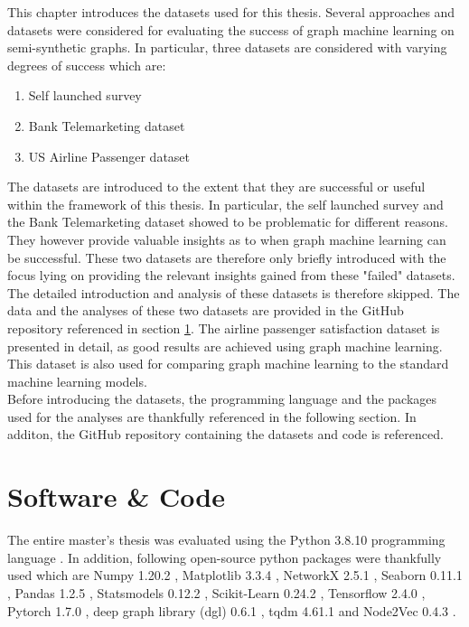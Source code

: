   
  This chapter introduces the datasets used for this thesis. Several approaches
  and datasets were considered for evaluating the success of graph machine
  learning on semi-synthetic graphs. In particular, three datasets are 
  considered with varying degrees of success which are:

  \begin{enumerate}
    \item Self launched survey
    \item Bank Telemarketing dataset
    \item US Airline Passenger dataset
  \end{enumerate}

  \noindent The datasets are introduced to the extent that they are successful 
  or useful within the framework of this thesis. In particular, the self 
  launched survey and the Bank Telemarketing dataset showed to be problematic 
  for different reasons. They however provide valuable insights as to when 
  graph machine learning can be successful. These two datasets are therefore 
  only briefly introduced with the focus lying on providing the relevant 
  insights gained from these "failed" datasets. The detailed introduction and
  analysis of these datasets is therefore skipped. The data and the analyses of
  these two datasets are provided in the GitHub repository referenced in
  section \ref{section:software}. The airline passenger satisfaction dataset 
  is presented in detail, as good results are achieved using graph machine 
  learning. This dataset is also used for comparing graph machine learning 
  to the standard machine learning models. \\

  \noindent Before introducing the datasets, the programming language and the
   packages used for the analyses are thankfully referenced in the following 
   section. In additon, the GitHub repository containing the datasets and code
   is referenced.

  \section{Software \& Code}
  \label{section:software}

  The entire master's thesis was evaluated using the Python 3.8.10 programming
  language \citep{vanRossum2009}. In addition, following open-source python
  packages were thankfully used which are Numpy 1.20.2 \citep{harris2020array},
  Matplotlib 3.3.4 \citep{Hunter2007}, NetworkX 2.5.1 \citep{hagberg2008exploring}, 
  Seaborn 0.11.1 \citep{Waskom2021}, Pandas 1.2.5 \citep{mckinney2010data}, 
  Statsmodels 0.12.2 \citep{seabold2010statsmodels}, Scikit-Learn 0.24.2 
  \citep{pedregosa2011scikit}, Tensorflow 2.4.0 \citep{abadi2016tensorflow}, 
  Pytorch 1.7.0 \citep{paszke2019pytorch}, deep graph library (dgl) 0.6.1 
  \citep{wang2019deep}, tqdm 4.61.1 \citep{da2021tqdm} and Node2Vec 0.4.3 
  \citep{Cohen2021}. \\

